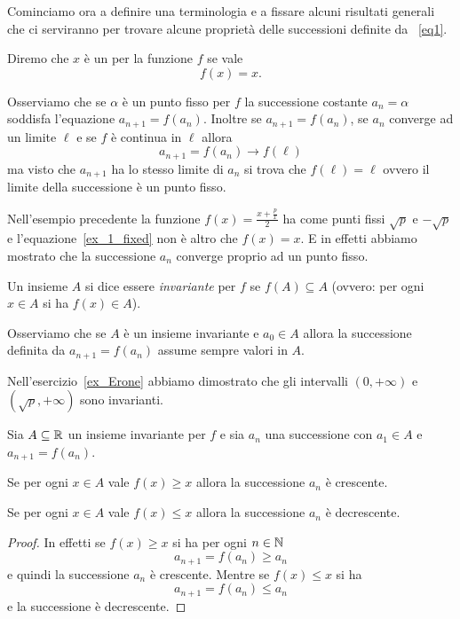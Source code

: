 Cominciamo ora a definire una terminologia e a fissare alcuni
risultati generali che ci serviranno per trovare alcune proprietà
delle successioni definite da~ \eqref{eq1}.

\begin{definition}
\mymark{**}
  Diremo che $x$ è un 
  per la funzione $f$ se vale
  \[
    f(x) = x.
  \]
\end{definition}
Osserviamo che se $\alpha$ è un punto fisso per $f$ la successione costante
$a_n=\alpha$ soddisfa l'equazione $a_{n+1} = f(a_n)$. Inoltre se
$a_{n+1} = f(a_n)$, se $a_n$ converge ad un limite $\ell$ e se
$f$ è continua in $\ell$ allora
\[
a_{n+1} = f(a_n) \to f(\ell)
\]
ma visto che $a_{n+1}$ ha lo stesso limite di $a_n$ si trova che
$f(\ell)=\ell$ ovvero il limite della successione è un punto fisso.

Nell'esempio precedente la funzione $f(x) = \frac{x+\frac p x}2$ ha come punti
fissi $\sqrt{p}$ e $-\sqrt{p}$ e l'equazione~\eqref{ex_1_fixed} non è
altro che $f(x)=x$. E in effetti abbiamo mostrato che la successione
$a_n$ converge proprio ad un punto fisso.

\begin{definition}
\mymark{**}
  Un insieme $A$ si dice essere \emph{invariante}
  per $f$ se
  $f(A)\subseteq A$
  (ovvero: per ogni $x\in A$ si ha $f(x)\in A$).
\end{definition}

Osserviamo che se $A$ è un insieme invariante e $a_0\in A$ allora la
successione definita da $a_{n+1}=f(a_n)$ assume sempre valori in $A$.

Nell'esercizio~\ref{ex_Erone} abbiamo dimostrato che gli intervalli
$(0,+\infty)$ e $(\sqrt{p},+\infty)$ sono invarianti.

\begin{theorem}\label{th_1}
\mymark{*}
  Sia $A\subseteq \mathbb R$ un insieme invariante per $f$ e sia $a_n$ una
  successione con $a_1 \in A$ e $a_{n+1}=f(a_n)$.

  Se per ogni $x\in A$
  vale $f(x) \ge x$
  allora la successione $a_n$ è crescente.

  Se per ogni $x\in A$ vale $f(x) \le x$
  allora la successione $a_n$ è decrescente.
\end{theorem}
\begin{proof}
\mymark{*}
  In effetti se $f(x) \ge x$ si ha per ogni $n\in \mathbb N$
  \[
  a_{n+1} = f(a_n) \ge a_n
  \]
e quindi la successione $a_n$ è crescente. Mentre se $f(x) \le x$ si ha
  \[
  a_{n+1} = f(a_n) \le a_n
  \]
e la successione è decrescente.
\end{proof}

